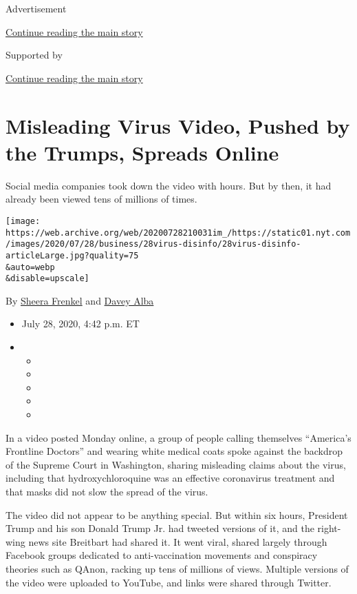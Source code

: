 Advertisement

\protect\hyperlink{after-top}{Continue reading the main story}

Supported by

\protect\hyperlink{after-sponsor}{Continue reading the main story}

\hypertarget{misleading-virus-video-pushed-by-the-trumps-spreads-online}{%
\section{Misleading Virus Video, Pushed by the Trumps, Spreads
Online}\label{misleading-virus-video-pushed-by-the-trumps-spreads-online}}

Social media companies took down the video with hours. But by then, it
had already been viewed tens of millions of times.

\texttt{[image: https://web.archive.org/web/20200728210031im\_/https://static01.nyt.com/images/2020/07/28/business/28virus-disinfo/28virus-disinfo-articleLarge.jpg?quality=75\\\&auto=webp\\\&disable=upscale]}

By
\href{https://web.archive.org/web/20200728210031/https://www.nytimes.com/by/sheera-frenkel}{Sheera
Frenkel} and
\href{https://web.archive.org/web/20200728210031/https://www.nytimes.com/by/davey-alba}{Davey
Alba}

\begin{itemize}
\item
  July 28, 2020, 4:42 p.m. ET
\item
  \begin{itemize}
  \item
  \item
  \item
  \item
  \item
  \end{itemize}
\end{itemize}

In a video posted Monday online, a group of people calling themselves
``America's Frontline Doctors'' and wearing white medical coats spoke
against the backdrop of the Supreme Court in Washington, sharing
misleading claims about the virus, including that hydroxychloroquine was
an effective coronavirus treatment and that masks did not slow the
spread of the virus.

The video did not appear to be anything special. But within six hours,
President Trump and his son Donald Trump Jr. had tweeted versions of it,
and the right-wing news site Breitbart had shared it. It went viral,
shared largely through Facebook groups dedicated to anti-vaccination
movements and conspiracy theories such as QAnon, racking up tens of
millions of views. Multiple versions of the video were uploaded to
YouTube, and links were shared through Twitter.


